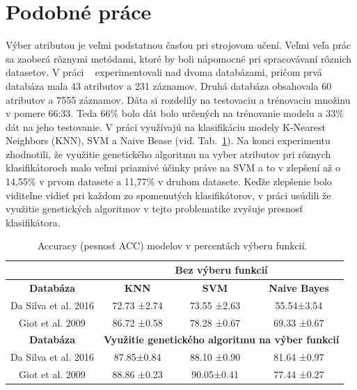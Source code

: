 \documentclass[runningheads]{llncs}
\begin{document}
\section{Podobné práce}

Výber atributou je veľmi podstatnou časťou pri strojovom učení. Veľmi veľa prác sa 
zaoberá rôznymi metódami, ktoré by boli nápomocné pri spracovávaní rôznich datasetov.
V práci ~\cite{ref_nascimento} experimentovali nad dvoma databázami, pričom 
prvá databáza mala 43 atributov a 231 záznamov. Druhá databáza obsahovala 60 atributov 
a 7555 záznamov. Dáta si rozdelily na testovaciu a trénovaciu množinu v pomere 66:33. 
Teda 66\% bolo dát bolo určených na trénovanie modelu a 33\% dát na jeho testovanie. 
V práci využívajú na klasifikáciu modely K-Nearest Neighbors (KNN), SVM a Naive Bease 
(viď. Tab.~\ref{tab_vyber_funkci}). Na konci experimentu zhodnotili, 
že využitie genetického algoritmu na vyber atributov pri rôznych klasifikátoroch malo veľmi priaznivé
účinky práve na SVM a to v zlepšení až o 14,55\% v prvom datasete a 11,77\% v druhom datasete.
Keďže zlepšenie bolo viditeľne vidieť pri každom zo spomenutých klasifikátorov, v práci usúdili že
využitie genetických algoritmov v tejto problematike zvyšuje presnosť klasifikátora.

\begin{table}[]
\centering
\caption{Accuracy (pesnosť ACC) modelov v percentách výberu funkcií.~\cite{ref_nascimento}}\label{tab_vyber_funkci}
\begin{tabular}{|c|c|c|c|}
\hline
                     & \multicolumn{3}{c|}{\textbf{Bez výberu funkcií}}                     \\ \hline
\textbf{Databáza}    & \textbf{KNN}          & \textbf{SVM}          & \textbf{Naive Bayes} \\ \hline
Da Silva et al. 2016 & 72.73 ±2.74           & 73.55 ±2.63           & 55.54±3.54           \\ \hline
Giot et al. 2009     & 86.72 ±0.58           & 78.28 ±0.67           & 69.33 ±0.67          \\ \hline
\textbf{Databáza}    & \multicolumn{3}{c|}{\textbf{Využitie genetického algoritmu na výber funkcií}} \\ \hline
Da Silva et al. 2016 & 87.85±0.84            & 88.10 ±0.90           & 81.64 ±0.97          \\ \hline
Giot et al. 2009     & 88.86 ±0.23           & 90.05±0.41            & 77.44 ±0.27          \\ \hline
\end{tabular}
\end{table}
\end{document}
